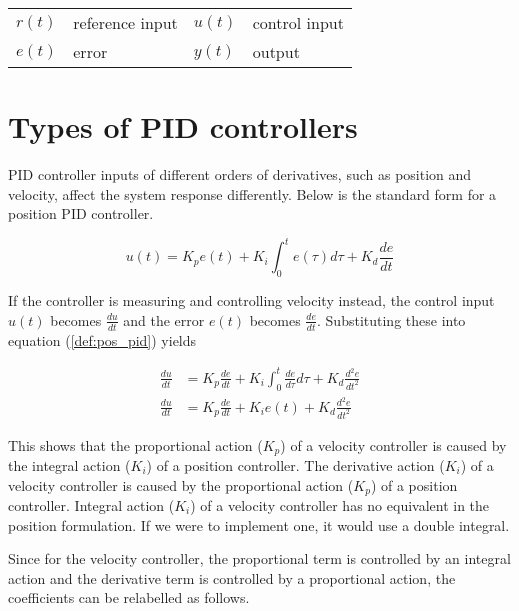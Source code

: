 \begin{center}
  \renewcommand{\arraystretch}{1.3}
  \begin{tabulary}{\linewidth}{LLLL}
    $r(t)$ & \gls{reference} input & $u(t)$ & control input \\
    $e(t)$ & error & $y(t)$ & \gls{output} \\
  \end{tabulary}
\end{center}

\section{Types of PID controllers}

PID controller inputs of different orders of derivatives, such as position and
velocity, affect the \gls{system} response differently. Below is the standard
form for a position PID controller.

\begin{definition}
  \begin{equation}
    u(t) = K_p e(t) + K_i \int_0^t e(\tau) d\tau + K_d \frac{de}{dt}
    \label{def:pos_pid}
  \end{equation}
\end{definition}

If the controller is measuring and controlling velocity instead, the control
input $u(t)$ becomes $\frac{du}{dt}$ and the error $e(t)$ becomes
$\frac{de}{dt}$. Substituting these into equation (\ref{def:pos_pid}) yields

\begin{align}
  \frac{du}{dt} &= K_p \frac{de}{dt} + K_i \int_0^t \frac{de}{d\tau} d\tau +
    K_d \frac{d^2e}{dt^2} \nonumber \\
  \frac{du}{dt} &= K_p \frac{de}{dt} + K_i e(t) + K_d \frac{d^2e}{dt^2}
\end{align}

This shows that the proportional action ($K_p$) of a velocity controller is
caused by the integral action ($K_i$) of a position controller. The derivative
action ($K_i$) of a velocity controller is caused by the proportional action
($K_p$) of a position controller. Integral action ($K_i$) of a velocity
controller has no equivalent in the position formulation. If we were to
implement one, it would use a double integral.

Since for the velocity controller, the proportional term is controlled by an
integral action and the derivative term is controlled by a proportional action,
the coefficients can be relabelled as follows.

